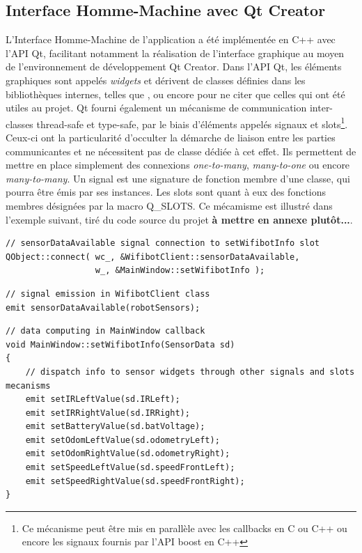   \subsection{Interface Homme-Machine avec Qt Creator}
  \label{subsection:Qt}
  
L'Interface Homme-Machine de l'application a été implémentée en C++ avec l'\gls{API} Qt, facilitant notamment la réalisation de l'interface graphique au moyen de l'environnement de développement Qt Creator. 
Dans l'\gls{API} Qt, les éléments graphiques sont appelés \emph{widgets} et dérivent de classes définies dans les bibliothèques internes, telles que ,  ou encore  pour ne citer 
que celles qui ont été utiles au projet.  
Qt fourni également un mécanisme de communication inter-classes thread-safe et type-safe, par le biais d'éléments appelés signaux et 
slots\footnote{Ce mécanisme peut être mis en parallèle avec les callbacks en C ou C++ ou encore les signaux fournis par l'API boost en C++}.
Ceux-ci ont la particularité d'occulter la démarche de liaison entre les parties communicantes et ne nécessitent pas de classe dédiée à cet effet. 
Ils permettent de mettre en place simplement des connexions \emph{one-to-many}, \emph{many-to-one} ou encore \emph{many-to-many}.
Un signal est une signature de fonction membre d'une classe, qui pourra être émis par ses instances. Les slots sont quant à eux des fonctions membres désignées par la macro Q\_SLOTS. 
Ce mécamisme est illustré dans l'exemple suivant, tiré du code source du projet \textbf{à mettre en annexe plutôt...}. 

\begin{lstlisting}[style=customcpp]
// sensorDataAvailable signal connection to setWifibotInfo slot
QObject::connect( wc_, &WifibotClient::sensorDataAvailable, 
				  w_, &MainWindow::setWifibotInfo );
\end{lstlisting}

\begin{lstlisting}[style=customcpp]
// signal emission in WifibotClient class
emit sensorDataAvailable(robotSensors);
\end{lstlisting}

\begin{lstlisting}[style=customcpp]
// data computing in MainWindow callback
void MainWindow::setWifibotInfo(SensorData sd)
{
    // dispatch info to sensor widgets through other signals and slots mecanisms
    emit setIRLeftValue(sd.IRLeft);
    emit setIRRightValue(sd.IRRight);
    emit setBatteryValue(sd.batVoltage);
    emit setOdomLeftValue(sd.odometryLeft);
    emit setOdomRightValue(sd.odometryRight);
    emit setSpeedLeftValue(sd.speedFrontLeft);
    emit setSpeedRightValue(sd.speedFrontRight);
}
\end{lstlisting}


